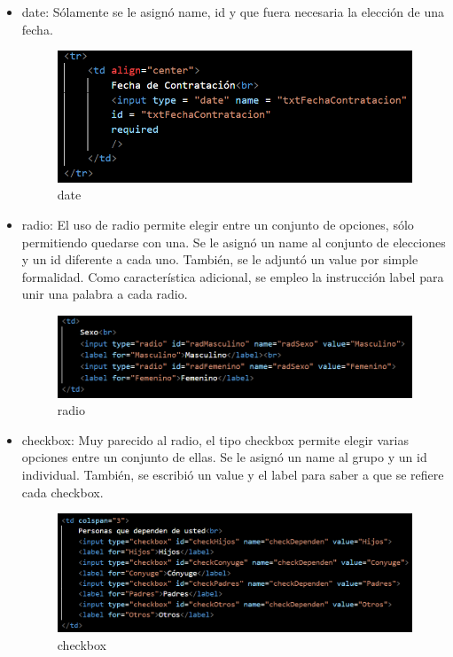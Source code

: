 \documentclass[10pt,a4paper]{article}
\begin{document}
\begin{itemize}
	\item  date: Sólamente se le asignó name, id y que fuera necesaria la elección de una fecha.
	
	\begin{figure}[H]
		\includegraphics[scale=.54]{Capture3}
		\centering
		\caption{date}
		\label{img:Capture3}
	\end{figure} 
	
	\pagebreak	
	
	\item  radio: El uso de radio permite elegir entre un conjunto de opciones, sólo permitiendo quedarse con una. Se le asignó un name al conjunto de elecciones y un id diferente a cada uno. También, se le adjuntó un value por simple formalidad. Como característica adicional, se empleo la instrucción label para unir una palabra a cada radio.
	
	\begin{figure}[H]
		\includegraphics[scale=.54]{Capture6}
		\centering
		\caption{radio}
		\label{img:Capture6}
	\end{figure} 
	
	\item  checkbox: Muy parecido al radio, el tipo checkbox permite elegir varias opciones entre un conjunto de ellas. Se le asignó un name al grupo y un id individual. También, se escribió un value y el label para saber a que se refiere cada checkbox.
	
	\begin{figure}[H]
		\includegraphics[scale=.54]{Capture7}
		\centering
		\caption{checkbox}
		\label{img:Capture7}
	\end{figure} 
	

\end{itemize}
\end{document}
